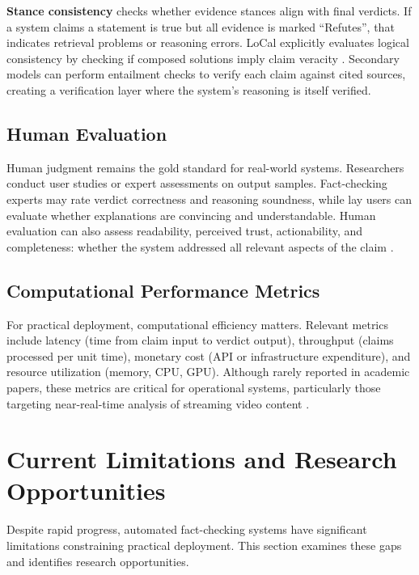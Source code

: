 \documentclass[12pt,a4paper]{article}
\begin{document}
\textbf{Stance consistency} checks whether evidence stances align with final verdicts. If a system claims a statement is true but all evidence is marked ``Refutes'', that indicates retrieval problems or reasoning errors. LoCal explicitly evaluates logical consistency by checking if composed solutions imply claim veracity \citep{chen2024local}. Secondary models can perform entailment checks to verify each claim against cited sources, creating a verification layer where the system's reasoning is itself verified.

\subsection{Human Evaluation}

Human judgment remains the gold standard for real-world systems. Researchers conduct user studies or expert assessments on output samples. Fact-checking experts may rate verdict correctness and reasoning soundness, while lay users can evaluate whether explanations are convincing and understandable. Human evaluation can also assess readability, perceived trust, actionability, and completeness: whether the system addressed all relevant aspects of the claim \citep{ma2025guided, wardle2017information}.

\subsection{Computational Performance Metrics}

For practical deployment, computational efficiency matters. Relevant metrics include latency (time from claim input to verdict output), throughput (claims processed per unit time), monetary cost (API or infrastructure expenditure), and resource utilization (memory, CPU, GPU). Although rarely reported in academic papers, these metrics are critical for operational systems, particularly those targeting near-real-time analysis of streaming video content \citep{hysonlab2025factagent, tian2024webagents}.

\section{Current Limitations and Research Opportunities}

Despite rapid progress, automated fact-checking systems have significant limitations constraining practical deployment. This section examines these gaps and identifies research opportunities.
\end{document}
